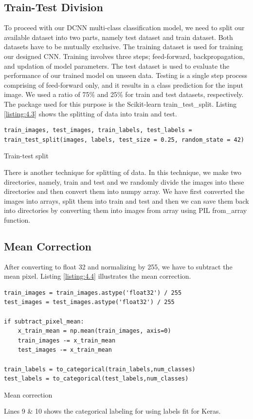 \subsection{Train-Test Division}
To proceed with our DCNN multi-class classification model,
we need to split our available dataset into two parts, namely test dataset and train dataset. Both datasets have to be mutually exclusive.
The training dataset is used for training our designed CNN.
Training involves three steps; feed-forward, backpropagation, and
updation of model parameters. The test dataset is used to evaluate the performance
of our trained model on unseen data. Testing is a single step process
comprising of feed-forward only, and it results in a  class
prediction for the input image. We used a ratio of 75\% and
25\% for train and test datasets, respectively. The package used for this purpose is the
Scikit-learn train\_test\_split. Listing \ref{listing:4.3} shows the splitting of
data into train and test.

\begin{listing}[H]
    \begin{verbatim}
train_images, test_images, train_labels, test_labels = 
train_test_split(images, labels, test_size = 0.25, random_state = 42)
\end{verbatim}
\caption{Train-test split}
\label{listing:4.3}
\end{listing}
There is another technique for splitting of data. In this technique, we make two directories,
namely, train and test and we randomly divide the images into these directories and then
convert them into numpy array. We have first converted the images
into arrays, split them into train and test and then we can save them back into
directories by converting them into images from array using PIL from\_array
function.

\subsection{Mean Correction}
After converting to float 32 and normalizing by 255, we have to subtract the mean pixel.
Listing \ref{listing:4.4} illustrates the mean correction.

\begin{listing}[H]
    \begin{verbatim}
train_images = train_images.astype('float32') / 255
test_images = test_images.astype('float32') / 255

if subtract_pixel_mean:
    x_train_mean = np.mean(train_images, axis=0)
    train_images -= x_train_mean
    test_images -= x_train_mean

train_labels = to_categorical(train_labels,num_classes)
test_labels = to_categorical(test_labels,num_classes)
    \end{verbatim}
    \caption{Mean correction}
\label{listing:4.4}
\end{listing}
\noindent Lines 9 \& 10 shows the categorical labeling for using labels fit for Keras.
